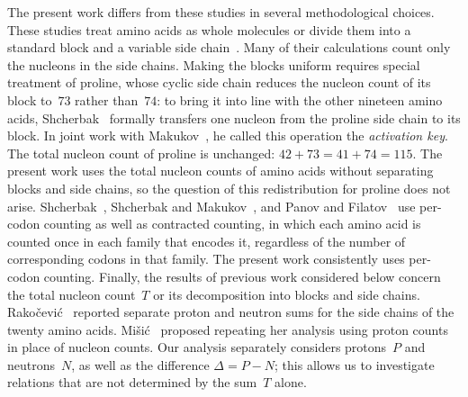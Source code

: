 \documentclass[11pt,a4paper]{article}
\renewcommand{\_}{\origunderscore\allowbreak}
\begin{document}
The present work differs from these studies in several
methodological choices. These studies treat amino acids as whole molecules or divide them into
a standard block and a variable side chain~\cite{shcherbak1993,shcherbak2003,makukov2013,panov2024}.
Many of their calculations count only the nucleons in the side chains. Making the blocks uniform
requires special treatment of proline, whose cyclic side
chain reduces the nucleon count of its block to~$73$
rather than~$74$: to bring it into line with the other
nineteen amino acids, Shcherbak~\cite{shcherbak1993} formally transfers one nucleon
from the proline side chain to its block. In joint work with
Makukov~\cite{makukov2013}, he called this operation the \emph{activation key}. The total nucleon count of proline
is unchanged: $42+73=41+74=115$.
The present work uses the total nucleon counts of amino
acids without separating blocks and side chains,
so the question of this redistribution for proline does not arise.
Shcherbak~\cite{shcherbak2003}, Shcherbak and Makukov~\cite{makukov2013}, and Panov and Filatov~\cite{panov2024} use per-codon counting as well as
contracted counting, in which each amino acid is counted
once in each family that encodes it, regardless of the number
of corresponding codons in that family. The present work
consistently uses per-codon counting. Finally, the results
of previous work considered below concern the total nucleon
count~$T$ or its decomposition into blocks and side chains.
Rako\v{c}evi\'c~\cite{rakocevic2011} reported separate proton and neutron sums
for the side chains of the twenty amino acids. Mi\v{s}i\'c~\cite{misic2016}
proposed repeating her analysis using proton counts in place of nucleon counts.
Our analysis separately considers protons~$P$ and neutrons~$N$,
as well as the difference $\Delta = P - N$; this allows us to
investigate relations that are not determined by the sum~$T$ alone.
\end{document}
